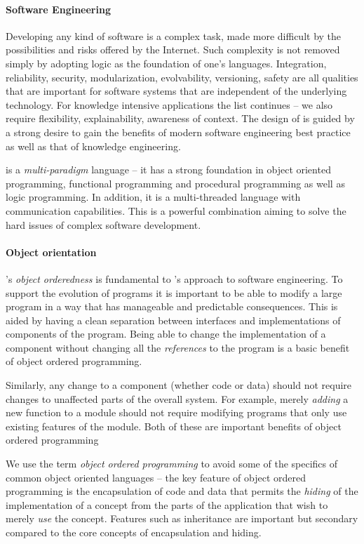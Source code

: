 \paragraph{Software Engineering}

Developing any kind of software is a complex task, made more difficult by the possibilities and risks offered by the Internet. Such complexity is not removed simply by adopting logic as the foundation of one's languages. Integration, reliability, security, modularization, evolvability, versioning, safety are all qualities that are important for software systems that are independent of the underlying technology. For knowledge intensive applications the list continues -- we also require flexibility, explainability, awareness of context. The design of \go is guided by a strong desire to gain the benefits of modern software engineering best practice as well as that of knowledge engineering. 

\go is a \emph{multi-paradigm} language -- it has a strong foundation in object oriented programming, functional programming and procedural programming as well as logic programming. In addition, it is a multi-threaded language with communication capabilities. This is a powerful combination aiming to solve the hard issues of complex software development.

\paragraph{Object orientation}
\go's \emph{object orderedness} is fundamental to \go's approach to  software engineering.  To support the evolution of programs it is important to be able to modify a large program in a way that has manageable and predictable consequences. This is aided by having a clean separation between interfaces and implementations of components of the program. Being able to change the implementation of a component without changing all the \emph{references} to the program is a basic benefit of object ordered programming.

Similarly, any change to a component (whether code or data) should not require changes to unaffected parts of the overall system. For example, merely \emph{adding} a new function to a module should not require modifying programs that only use existing features of the module. Both of these are important benefits of object ordered programming

\begin{aside}
We use the term \emph{object ordered programming} to avoid some of the specifics of common object oriented languages -- the key feature of object ordered programming is the encapsulation of code and data that permits the \emph{hiding} of the implementation of a concept from the parts of the application that wish to merely \emph{use} the concept. Features such as inheritance are important but secondary compared to the core concepts of encapsulation and hiding.
\end{aside}

